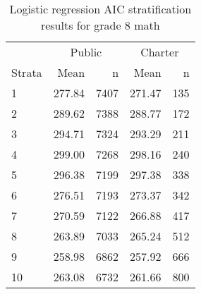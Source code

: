 \begin{table}[h!]
\centering
\caption{Logistic regression AIC stratification results for grade 8 math} 
\label{g8math-circpsa10AIC}
\begin{tabular}{lrr@{\extracolsep{.2cm}}rr}
  \hline
   & \multicolumn{2}{c}{Public} & \multicolumn{2}{c}{Charter} \\ \cline{2-3} \cline{4-5} Strata & Mean & n & Mean & n \\ \hline
1 & 277.84 & 7407 & 271.47 & 135 \\ 
  2 & 289.62 & 7388 & 288.77 & 172 \\ 
  3 & 294.71 & 7324 & 293.29 & 211 \\ 
  4 & 299.00 & 7268 & 298.16 & 240 \\ 
  5 & 296.38 & 7199 & 297.38 & 338 \\ 
  6 & 276.51 & 7193 & 273.37 & 342 \\ 
  7 & 270.59 & 7122 & 266.88 & 417 \\ 
  8 & 263.89 & 7033 & 265.24 & 512 \\ 
  9 & 258.98 & 6862 & 257.92 & 666 \\ 
  10 & 263.08 & 6732 & 261.66 & 800 \\ 
   \hline
\end{tabular}
\end{table}
